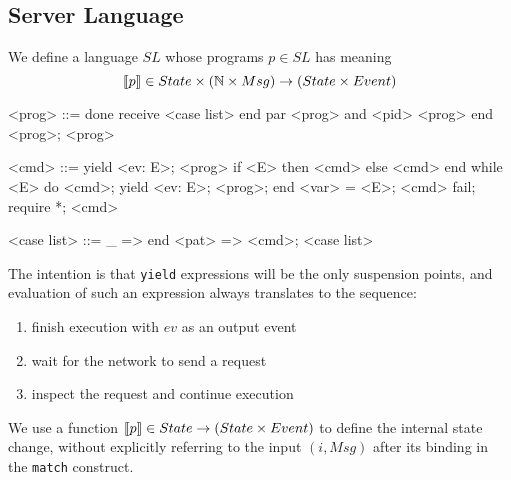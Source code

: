 \documentclass[acmsmall,review,anonymous]{acmart}\settopmatter{printfolios=true}
\begin{document}
\subsection{Server Language}

We define a language $SL$ whose programs $p\in SL$ has meaning \[\semfunc[p] \in State \times (\mathbb{N} \times Msg) \rightarrow (State \times Event)\]

\begin{grammar}
    <prog> ::= done
         \alt receive <case list> end   %
         \alt par <prog> and <pid> <prog> end
         \alt <prog>; <prog>

	<cmd> ::= yield <ev: E>; <prog>                 %
         \alt if <E> then <cmd> else <cmd> end   %
         \alt while <E> do <cmd>; yield <ev: E>; <prog>; end    %
         \alt <var> = <E>; <cmd>
         \alt fail;
         \alt require *; <cmd>

    <case list> ::= \_ => end
        \alt <pat> => <cmd>; <case list>
\end{grammar}

The intention is that \texttt{yield} expressions will be the only suspension points, and evaluation of such an expression always translates to the sequence:
\begin{enumerate}
\item finish execution with $ev$ as an output event
\item wait for the network to send a request
\item inspect the request and continue execution
\end{enumerate}

We use a function $\semfunc[p] \in State \rightarrow (State \times Event)$ to define the internal state change, without explicitly referring to the input $(i, Msg)$ after its binding in the \texttt{match} construct.
\end{document}
